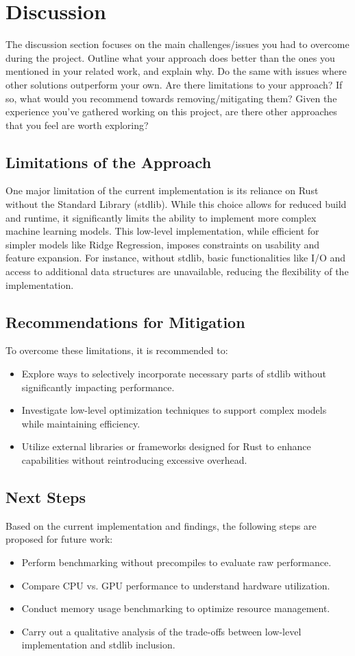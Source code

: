 \documentclass{scrartcl}
\begin{document}
\section{Discussion}
The discussion section focuses on the main challenges/issues you had to overcome during the project. Outline what your approach does better than the ones you mentioned in your related work, and explain why. Do the same with issues where other solutions  outperform your own. Are there limitations to your approach? If so, what would you recommend towards removing/mitigating them? Given the experience you've gathered working on this project, are there other approaches that you feel are worth exploring?
\subsection{Limitations of the Approach}
One major limitation of the current implementation is its reliance on Rust without the Standard Library (stdlib). While this choice allows for reduced build and runtime, it significantly limits the ability to implement more complex machine learning models. This low-level implementation, while efficient for simpler models like Ridge Regression, imposes constraints on usability and feature expansion. For instance, without stdlib, basic functionalities like I/O and access to additional data structures are unavailable, reducing the flexibility of the implementation.

\subsection{Recommendations for Mitigation}
To overcome these limitations, it is recommended to:
\begin{itemize}
    \item Explore ways to selectively incorporate necessary parts of stdlib without significantly impacting performance.
    \item Investigate low-level optimization techniques to support complex models while maintaining efficiency.
    \item Utilize external libraries or frameworks designed for Rust to enhance capabilities without reintroducing excessive overhead.
\end{itemize}

\subsection{Next Steps}
Based on the current implementation and findings, the following steps are proposed for future work:
\begin{itemize}
    \item Perform benchmarking without precompiles to evaluate raw performance.
    \item Compare CPU vs. GPU performance to understand hardware utilization.
    \item Conduct memory usage benchmarking to optimize resource management.
    \item Carry out a qualitative analysis of the trade-offs between low-level implementation and stdlib inclusion.
\end{itemize}
\end{document}
